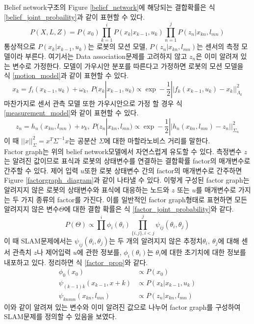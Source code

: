 \documentclass[master,korean,final]{cbnu-ecs}
\begin{document}
Belief network구조의 Figure \ref{belief_network}에 해당되는 결합확률은 식 \eqref{belief_joint_probaility}과 같이 표현할 수 있다.
\begin{equation}
\label{belief_joint_probaility}
P(X, L, Z)=P(x_0)\prod^i_{k=1}P(x_k|x_{k-1}, u_k)\prod^j_{n=1}P(z_n|x_{kn}, l_{mn})
\end{equation}
통상적으로 $P(x_k|x_{k-1}, u_k)$는 로봇의 모션 모델, $P(z_n|x_{kn}, l_{mn})$는 센서의 측정 모델이라 부른다.  여기서는 Data association문제를 고려하지 않고 $z_n$은 이미 알려져 있는 변수로 가정한다. 모델이 가우시안 분포를 따른다고 가정하면 로봇의 모션 모델을 식 \eqref{motion_model}과 같이 표현할 수 있다.
\begin{equation}
\label{motion_model}
x_k = f_i(x_{k-1}, u_k) + \omega_k,\ P(x_k|x_{k-1}, u_k)\propto \exp-\frac{1}{2}||f_k(x_{k-1}, u_k)-x_k||^2_{\Lambda_k}
\end{equation}
마찬가지로 센서 관측 모델 또한 가우시안으로 가정 할 경우 식 \eqref{measurement_model}와 같이 표현할 수 있다.
\begin{equation}
\label{measurement_model}
z_n = h_n(x_{kn}, l_{mn}) + \nu_k,\ P(z_n|x_{kn}, l_{mn})\propto \exp-\frac{1}{2}||h_n(x_{kn}, l_{mn})-z_n||^2_{\Sigma_n}
\end{equation}
이 때  $||x||^2_\Sigma=x^T\Sigma^{-1} x$는 공분산 $\Sigma$에 대한 마할라노비스 거리를 말한다. \\
Factor graph는 위의 belief network모델에서 자연스럽게 유도할 수 있다. 측정변수 $z$는 알려진 값이므로  표식과 로봇의 상태변수를 연결하는 결합확률 factor의 매개변수로 간주할 수 있다. 제어 입력 $u$또한 로봇 상태변수 간의 factor의 매개변수로 간주하면 Figure \ref{factorgraph_diagram}과 같이 나타낼 수 있다. 이렇게 구성된 factor graph는 알려지지 않은 로봇의 상태변수와 표식에 대응하는 노드와 $z$ 또는 $u$를 매개변수로 가지는 두 가지 종류의 factor를 가진다. 이를 일반적인 factor graph형태로 표현하면 모든 알려지지 않은 변수$\Theta$에 대한 결합 확률은 식 \eqref{factor_joint_probability}와 같다.
\begin{equation}
\label{factor_joint_probability}
P(\Theta) \propto \prod^i\phi_i(\theta_i)\prod^j_{\{i,j\}, i< j}\psi_{ij}(\theta_i, \theta_j)
\end{equation}
이 때 SLAM문제에서는 $\psi_{ij}(\theta_i, \theta_j)$는 두 개의 알려지지 않은 추정치$\theta_i,\ \theta_j$에 대해 센서 관측치 $z$나 제어입력 $u$에 관한 정보를, $\phi_i(\theta_i)$는 $\theta_i$에 대한 초기치에 대한 정보를 내포하고 있다. 정리하면 식 \eqref{factor_prop}와 같다.
\begin{equation}\label{factor_prop}
\begin{split}
\phi_0(x_0)& \propto P(x_0) \\
\psi_{(k-1)k}(x_{k-1}, x+k)& \propto P(x_k|x_{k-1}, u_k) \\
\psi_{knmn}(x_{kn}, l_{mn})& \propto P(z_n|x_{kn}, l_{mn})
\end{split}
\end{equation}
이와 같이 알려져 있는 변수와 이미 알려진 값으로 나누어 factor graph를 구성하여 SLAM문제를 정의할 수 있음을 보였다.
\end{document}
